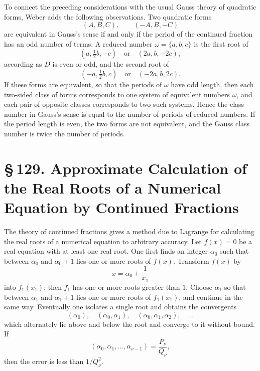 \documentclass[11pt]{article}
\providecommand{\sect}[2]{\section*{\S\,#1. #2}}
\begin{document}
To connect the preceding considerations with the usual Gauss theory of quadratic forms, Weber adds the following observations. Two quadratic forms
\[
        (A,B,C),\qquad (-A,B,-C)
\]
are equivalent in Gauss's sense if and only if the period of the continued fraction has an odd number of terms. A reduced number $\omega=\{a,b,c\}$ is the first root of
\[
        (a,\tfrac12 b,-c)\quad\text{or}\quad(2a,b,-2c),
\]
according as $D$ is even or odd, and the second root of
\[
        (-a,\tfrac12 b,c)\quad\text{or}\quad(-2a,b,2c).
\]
If these forms are equivalent, so that the periods of $\omega$ have odd length, then each two-sided class of forms corresponds to one system of equivalent numbers $\omega$, and each pair of opposite classes corresponds to two such systems. Hence the class number in Gauss's sense is equal to the number of periods of reduced numbers. If the period length is even, the two forms are not equivalent, and the Gauss class number is twice the number of periods.

\sect{129}{Approximate Calculation of the Real Roots of a Numerical Equation by Continued Fractions}

The theory of continued fractions gives a method due to Lagrange for calculating the real roots of a numerical equation to arbitrary accuracy. Let $f(x)=0$ be a real equation with at least one real root. One first finds an integer $\alpha_0$ such that between $\alpha_0$ and $\alpha_0+1$ lies one or more roots of $f(x)$. Transform $f(x)$ by
\[
        x=\alpha_0+\frac1{x_1}
\]
into $f_1(x_1)$; then $f_1$ has one or more roots greater than $1$. Choose $\alpha_1$ so that between $\alpha_1$ and $\alpha_1+1$ lies one or more roots of $f_1(x_1)$, and continue in the same way. Eventually one isolates a single root and obtains the convergents
\[
        (\alpha_0),\quad(\alpha_0,\alpha_1),\quad
        (\alpha_0,\alpha_1,\alpha_2),\quad\ldots
\]
which alternately lie above and below the root and converge to it without bound. If
\[
        (\alpha_0,\alpha_1,\ldots,\alpha_{\nu-1})=\frac{P_\nu}{Q_\nu},
\]
then the error is less than $1/Q_\nu^2$.
\end{document}
